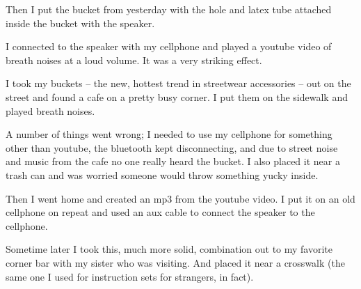 \documentclass[11pt]{report}
\begin{document}
Then I put the bucket from yesterday with the hole and latex tube attached inside the bucket with the speaker. 

I connected to the speaker with my cellphone and played a youtube video of breath noises at a loud volume. It was a very striking effect.

I took my buckets -- the new, hottest trend in streetwear accessories -- out on the street and found a cafe on a pretty busy corner. I put them on the sidewalk and played breath noises.

A number of things went wrong; I needed to use my cellphone for something other than youtube, the bluetooth kept disconnecting, and due to street noise and music from the cafe no one really heard the bucket. I also placed it near a trash can and was worried someone would throw something yucky inside.

Then I went home and created an mp3 from the youtube video. I put it on an old cellphone on repeat and used an aux cable to connect the speaker to the cellphone. 

Sometime later I took this, much more solid, combination out to my favorite corner bar with my sister who was visiting. And placed it near a crosswalk (the same one I used for instruction sets for strangers, in fact).
\end{document}

